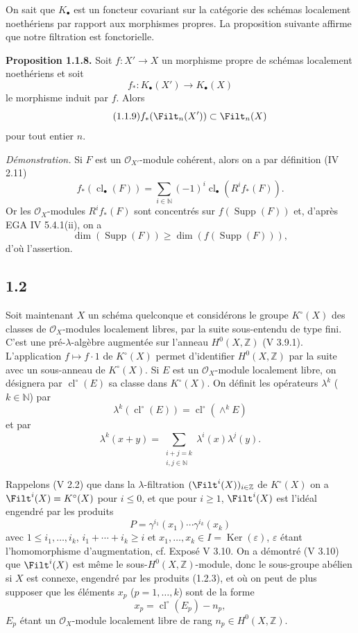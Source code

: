 \documentclass[11pt]{article}
\newcommand{\cl}{\operatorname{cl}}
\providecommand{\Ker}{\operatorname{Ker}}
\providecommand{\Supp}{\operatorname{Supp}}
\begin{document}
On sait que $K_\bullet$ est un foncteur covariant sur la catégorie des schémas localement noethériens par rapport aux morphismes propres. La proposition suivante affirme que notre filtration est fonctorielle.

\textbf{Proposition 1.1.8.} Soit $f:X'\to X$ un morphisme propre de schémas localement noethériens et soit
\[
f_*:K_\bullet(X')\longrightarrow K_\bullet(X)
\]
le morphisme induit par $f$. Alors
\begin{equation}\tag{1.1.9}
f_*(\Filt_n(X'))\subset\Filt_n(X)
\end{equation}
pour tout entier $n$.

\emph{Démonstration.} Si $F$ est un $\mathcal O_{X'}$-module cohérent, alors on a par définition (IV 2.11)
\[
f_*(\cl_\bullet(F))=\sum_{i\in\mathbb N}(-1)^i\cl_\bullet(R^if_*(F)).
\]
Or les $\mathcal O_X$-modules $R^if_*(F)$ sont concentrés sur $f(\Supp(F))$ et, d'après EGA IV 5.4.1(ii), on a
\[
\dim(\Supp(F))\geq\dim(f(\Supp(F))),
\]
d'où l'assertion.

\subsection*{1.2}
Soit maintenant $X$ un schéma quelconque et considérons le groupe $K^\circ(X)$ des classes de $\mathcal O_X$-modules localement libres, par la suite sous-entendu de type fini. C'est une pré-$\lambda$-algèbre augmentée sur l'anneau $H^0(X,\mathbb Z)$ (V 3.9.1). L'application $f\mapsto f\cdot1$ de $K^\circ(X)$ permet d'identifier $H^0(X,\mathbb Z)$ par la suite avec un sous-anneau de $K^\circ(X)$. Si $E$ est un $\mathcal O_X$-module localement libre, on désignera par $\cl^\circ(E)$ sa classe dans $K^\circ(X)$. On définit les opérateurs $\lambda^k$ ($k\in\mathbb N$) par
\begin{equation}\tag{1.2.1}
\lambda^k(\cl^\circ(E))=\cl^\circ(\wedge^kE)
\end{equation}
et par
\begin{equation}\tag{1.2.2}
\lambda^k(x+y)=\sum_{\substack{i+j=k\\ i,j\in\mathbb N}}\lambda^i(x)\lambda^j(y).
\end{equation}

Rappelons (V 2.2) que dans la $\lambda$-filtration $(\Filt^i(X))_{i\in\mathbb Z}$ de $K^\circ(X)$ on a $\Filt^i(X)=K^\circ(X)$ pour $i\leq0$, et que pour $i\geq1$, $\Filt^i(X)$ est l'idéal engendré par les produits
\begin{equation}\tag{1.2.3}
P=\gamma^{i_1}(x_1)\cdots\gamma^{i_k}(x_k)
\end{equation}
avec $1\leq i_1,\ldots,i_k$, $i_1+\cdots+i_k\geq i$ et $x_1,\ldots,x_k\in I=\Ker(\varepsilon)$, $\varepsilon$ étant l'homomorphisme d'augmentation, cf. Exposé V 3.10. On a démontré (V 3.10) que $\Filt^i(X)$ est même le sous-$H^0(X,\mathbb Z)$-module, donc le sous-groupe abélien si $X$ est connexe, engendré par les produits (1.2.3), et où on peut de plus supposer que les éléments $x_p$ ($p=1,\ldots,k$) sont de la forme
\begin{equation}\tag{1.2.4}
x_p=\cl^\circ(E_p)-n_p,
\end{equation}
$E_p$ étant un $\mathcal O_X$-module localement libre de rang $n_p\in H^0(X,\mathbb Z)$.
\end{document}
